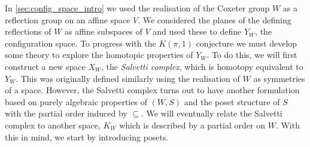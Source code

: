 \documentclass[class=article, crop=false]{standalone}
\begin{document}
In \cref{sec:config_space_intro} we used the realisation of the Coxeter group $W$ as a reflection group on an affine space $V$. We considered the planes of the defining reflections of $W$ as affine subspaces of $V$ and used these to define $Y_W$, the configuration space. To progress with the $K(\pi,1 )$ conjecture we must develop some theory to explore the homotopic properties of $Y_W$. To do this, we will first construct a new space $X_W$, the \emph{Salvetti complex}, which is homotopy equivalent to $Y_W$. This was originally defined \cite{salvetti_topology_1987, salvetti_homotopy_1994} similarly using the realisation of $W$ as symmetries of a space. However, the Salvetti complex turns out to have another formulation based on purely algebraic properties of $(W,S)$ and the poset structure of $S$ with the partial order induced by $\subseteq$. We will eventually relate the Salvetti complex to another space, $K_W$ which is described by a partial order on $W$. With this in mind, we start by introducing posets.
\end{document}

